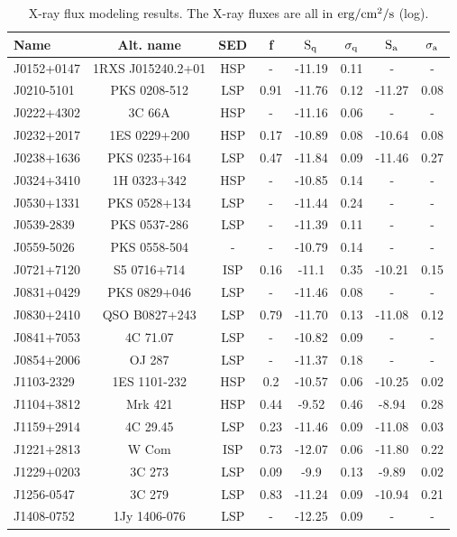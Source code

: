 \begin{table}
\caption{X-ray flux modeling results. The X-ray fluxes are all in $\rm erg/cm^2/s$ (log).}
\scriptsize
\begin{tabular}{lccccccc}
\toprule
Name & Alt. name & SED  & f & $\rm S_q$  & $\rm \sigma_q$ & $\rm S_a$  & $\rm \sigma_a$ \\
\midrule
J0152+0147 & 1RXS J015240.2+01 & HSP & - & -11.19 & 0.11 & - & - \\ 
J0210-5101 & PKS 0208-512 & LSP & 0.91 & -11.76 & 0.12 & -11.27 & 0.08  \\
J0222+4302 & 3C 66A & HSP & - & -11.16 & 0.06 & - & - \\ 
J0232+2017 & 1ES 0229+200 & HSP & 0.17 & -10.89 & 0.08 & -10.64 & 0.08  \\
J0238+1636 & PKS 0235+164 & LSP & 0.47 & -11.84 & 0.09 & -11.46 & 0.27 \\
J0324+3410 & 1H 0323+342 & HSP & - & -10.85 & 0.14 & - & - \\ 
J0530+1331 & PKS 0528+134 & LSP & - & -11.44 & 0.24 & - & - \\ 
J0539-2839 & PKS 0537-286 & LSP & - & -11.39 & 0.11 & - & - \\
J0559-5026 & PKS 0558-504 & - & - & -10.79 & 0.14 & - & - \\
J0721+7120 & S5 0716+714 & ISP & 0.16 & -11.1 & 0.35 & -10.21 & 0.15  \\
J0831+0429 & PKS 0829+046 & LSP & - & -11.46 & 0.08 & - & - \\
J0830+2410 & QSO B0827+243 & LSP & 0.79 & -11.70 & 0.13 & -11.08 & 0.12  \\
J0841+7053 & 4C 71.07 & LSP & - & -10.82 & 0.09 & - & - \\
J0854+2006 & OJ 287 & LSP & - & -11.37 & 0.18 & - & - \\
J1103-2329 & 1ES 1101-232 & HSP & 0.2 & -10.57 & 0.06 & -10.25 & 0.02  \\
J1104+3812 & Mrk 421 & HSP & 0.44 & -9.52 & 0.46 & -8.94 & 0.28  \\
J1159+2914 & 4C 29.45 & LSP & 0.23 & -11.46 & 0.09 & -11.08 & 0.03  \\
J1221+2813 & W Com & ISP & 0.73 & -12.07 & 0.06 & -11.80 & 0.22  \\
J1229+0203 & 3C 273 & LSP & 0.09 & -9.9 & 0.13 & -9.89 & 0.02  \\
J1256-0547 & 3C 279 & LSP & 0.83 & -11.24 & 0.09 & -10.94 & 0.21  \\
J1408-0752 & 1Jy 1406-076 & LSP & - & -12.25 & 0.09 & - & - \\ 

\end{tabular}
\end{table}
